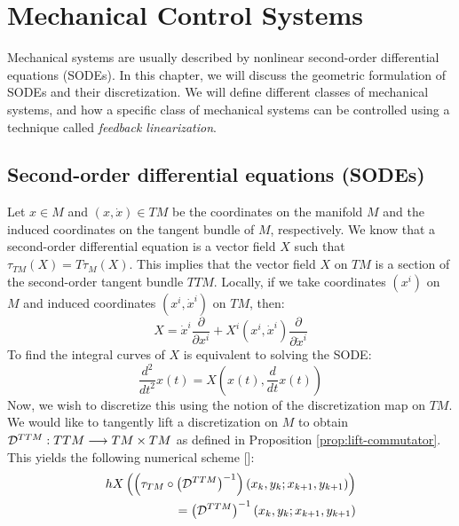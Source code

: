 
\chapter{Mechanical Control Systems} %

\label{chap:sode} %

Mechanical systems are usually described by nonlinear second-order differential equations (SODEs). In this chapter, we will discuss the geometric formulation of SODEs and their discretization. We will define different classes of mechanical systems, and how a specific class of mechanical systems can be controlled using a technique called \textit{feedback linearization}.

\section{Second-order differential equations (SODEs)} 
Let $x \in M$ and $(x, \dot{x}) \in TM$ be the coordinates on the manifold $M$ and the induced coordinates on the tangent bundle of $M$, respectively. We know that a second-order differential equation is a vector field $X$ such that $\tau_{TM}(X) = T \tau_M (X)$. This implies that the vector field $X$ on $TM$ is a section of the second-order tangent bundle $TTM$. Locally, if we take coordinates $(x^i)$ on $M$ and induced coordinates $(x^i, \dot{x}^i)$ on $TM$, then:
\begin{equation}
    X = \dot{x}^i \frac{\partial}{\partial x^i} + X^i(x^i, \dot{x}^i) \frac{\partial}{\partial \dot{x}^i}
\end{equation}
To find the integral curves of $X$ is equivalent to solving the SODE:
\begin{equation}
\label{eq:sode}
    \dfrac{d^2}{dt^2}x(t) = X \left( x(t), \dfrac{d}{dt}x(t) \right) 
\end{equation}
Now, we wish to discretize this using the notion of the discretization map on $TM$. We would like to tangently lift a discretization on $M$ to obtain $\mathcal{D}^{TTM}: TTM \longrightarrow TM \times TM$ as defined in Proposition \ref{prop:lift-commutator}. This yields the following numerical scheme [\cite{21MBLDMdD}]:
\begin{equation}
\label{eq:disc}
\begin{split}
    h X \left( \left(\tau_{TM} \circ \left(\mathcal{D}^{TTM}\right)^{-1}\right)(x_k, y_k; x_{k+1}, y_{k+1})\right) \\ = \left(\mathcal{D}^{TTM}\right)^{-1} (x_k, y_k; x_{k+1}, y_{k+1})
\end{split}
\end{equation}

